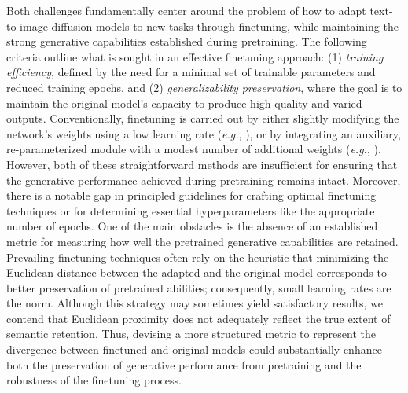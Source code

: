 Both challenges fundamentally center around the problem of how to adapt text-to-image diffusion models to new tasks through finetuning, while maintaining the strong generative capabilities established during pretraining. The following criteria outline what is sought in an effective finetuning approach: (1) \emph{training efficiency}, defined by the need for a minimal set of trainable parameters and reduced training epochs, and (2) \emph{generalizability preservation}, where the goal is to maintain the original model’s capacity to produce high-quality and varied outputs. Conventionally, finetuning is carried out by either slightly modifying the network’s weights using a low learning rate (\emph{e.g.}, \cite{ruiz2023dreambooth}), or by integrating an auxiliary, re-parameterized module with a modest number of additional weights (\emph{e.g.}, \cite{hulora2022,zhang2023adding}). However, both of these straightforward methods are insufficient for ensuring that the generative performance achieved during pretraining remains intact. Moreover, there is a notable gap in principled guidelines for crafting optimal finetuning techniques or for determining essential hyperparameters like the appropriate number of epochs. One of the main obstacles is the absence of an established metric for measuring how well the pretrained generative capabilities are retained. Prevailing finetuning techniques often rely on the heuristic that minimizing the Euclidean distance between the adapted and the original model corresponds to better preservation of pretrained abilities; consequently, small learning rates are the norm. Although this strategy may sometimes yield satisfactory results, we contend that Euclidean proximity does not adequately reflect the true extent of semantic retention. Thus, devising a more structured metric to represent the divergence between finetuned and original models could substantially enhance both the preservation of generative performance from pretraining and the robustness of the finetuning process.

